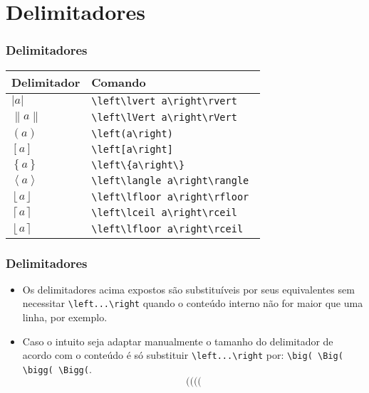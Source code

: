 \documentclass[brazilian]{beamer}
\begin{document}
\section{Delimitadores}
\begin{frame}[fragile]
    \frametitle{Delimitadores}

    \begin{table}
        \begin{tabular}{O{1.5cm}l}
            Delimitador & Comando \\ \hline
            \(\left\lvert a\right\rvert  \) & \lstinline[style=myStyleLatex]!\left\lvert a\right\rvert ! \\ \hline
            \(\left\lVert a\right\rVert \) & \lstinline[style=myStyleLatex]!\left\lVert a\right\rVert ! \\ \hline
            \(\left(a\right)  \) & \lstinline[style=myStyleLatex]!\left(a\right) ! \\ \hline
            \(\left[a\right] \) & \lstinline[style=myStyleLatex]!\left[a\right] ! \\ \hline
            \(\left\{a\right\} \) & \lstinline[style=myStyleLatex]!\left\{a\right\} ! \\ \hline
            \(\left\langle a\right\rangle \) & \lstinline[style=myStyleLatex]!\left\langle a\right\rangle ! \\ \hline
            \(\left\lfloor a\right\rfloor \) & \lstinline[style=myStyleLatex]!\left\lfloor a\right\rfloor ! \\ \hline
            \(\left\lceil a\right\rceil \) & \lstinline[style=myStyleLatex]!\left\lceil a\right\rceil ! \\ \hline
            \(\left\lfloor a\right\rceil \) & \lstinline[style=myStyleLatex]!\left\lfloor a\right\rceil ! \\ \hline
        \end{tabular}
    \end{table}

\end{frame}

\begin{frame}[fragile]
    \frametitle{Delimitadores}

    \begin{itemize}
        \item Os delimitadores acima expostos são substituíveis por seus equivalentes sem necessitar \lstinline[style=myStyleLatex]!\left...\right! quando o conteúdo interno não for maior que uma linha, por exemplo.
        \item Caso o intuito seja adaptar manualmente o tamanho do delimitador de acordo com o conteúdo é só substituir \lstinline[style=myStyleLatex]!\left...\right! por: \lstinline[style=myStyleLatex]!\big( \Big( \bigg( \Bigg(!.
        \[\big( \Big( \bigg( \Bigg(\]
    \end{itemize}

\end{frame}
\end{document}
